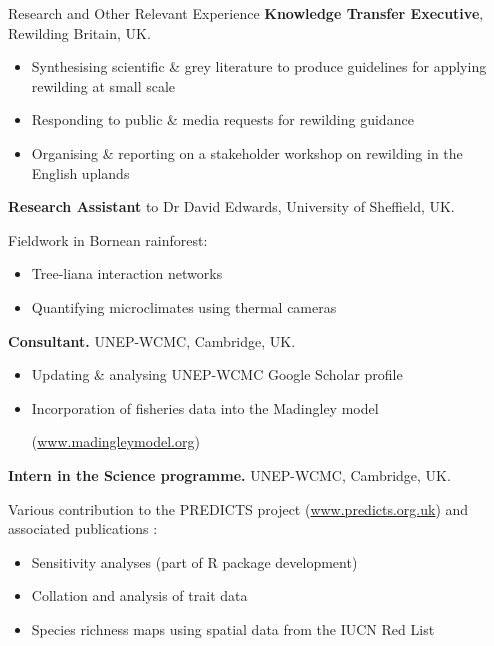\renewcommand\labelitemi{$\diamond$}

\begin{rubric}{Research and Other Relevant Experience}
\entry*[2016]%
	\textbf{Knowledge Transfer Executive}, Rewilding Britain, UK.
	\begin{itemize}[topsep=0pt,itemsep=-1ex,partopsep=1ex,parsep=1ex]
	\item Synthesising scientific \& grey literature to produce guidelines for applying rewilding at small scale
    \item Responding to public \& media requests for rewilding guidance
    \item Organising \& reporting on a stakeholder workshop on rewilding in the English uplands \parencite{sandom_rewilding_2018}
    \end{itemize}
\entry*[2014]%
	\textbf{Research Assistant} to Dr David Edwards, University of Sheffield, UK.
    \par Fieldwork in Bornean rainforest: 
    \begin{itemize}[topsep=0pt,itemsep=-1ex,partopsep=1ex,parsep=1ex]
    \item Tree-liana interaction networks \parencite{magrach_selective_2016}
    \item Quantifying microclimates using thermal cameras \parencite{scheffers_extreme_2017}
    \end{itemize}
\entry*[2013 -- 2014]%
	\textbf{Consultant.} UNEP-WCMC, Cambridge, UK.
	\begin{itemize}[topsep=0pt,itemsep=-1ex,partopsep=1ex,parsep=1ex]
	\item Updating \& analysing UNEP-WCMC Google Scholar profile
	\item Incorporation of fisheries data into the Madingley model \par (\url{www.madingleymodel.org})
	\end{itemize}
\entry*[2013]%
	\textbf{Intern in the Science programme.} UNEP-WCMC, Cambridge, UK.
	\par Various contribution to the PREDICTS project (\url{www.predicts.org.uk}) and associated publications \parencite{newbold_global_2015, hudson_predicts_2014, hudson_database_2017}: 
	\begin{itemize}[topsep=0pt,itemsep=-1ex,partopsep=1ex,parsep=1ex]
	\item Sensitivity analyses (part of R package development)
	\item Collation and analysis of trait data
	\item Species richness maps using spatial data from the IUCN Red List
	\end{itemize}
%
\end{rubric}